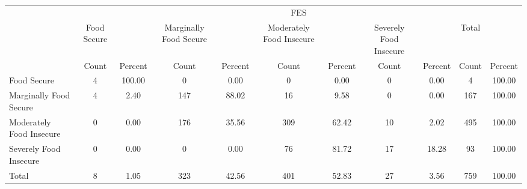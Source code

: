 {
\def\sym#1{\ifmmode^{#1}\else\(^{#1}\)\fi}
\begin{tabular}{l*{5}{cc}}
\hline\hline
            &\multicolumn{10}{c}{FES}                                                                                                         \\
            & Food Secure&            &Marginally Food Secure&            &Moderately Food Insecure&            &Severely Food Insecure&            &       Total&            \\
            &       Count&     Percent&       Count&     Percent&       Count&     Percent&       Count&     Percent&       Count&     Percent\\
\hline
Food Secure &           4&      100.00&           0&        0.00&           0&        0.00&           0&        0.00&           4&      100.00\\
Marginally Food Secure&           4&        2.40&         147&       88.02&          16&        9.58&           0&        0.00&         167&      100.00\\
Moderately Food Insecure&           0&        0.00&         176&       35.56&         309&       62.42&          10&        2.02&         495&      100.00\\
Severely Food Insecure&           0&        0.00&           0&        0.00&          76&       81.72&          17&       18.28&          93&      100.00\\
Total       &           8&        1.05&         323&       42.56&         401&       52.83&          27&        3.56&         759&      100.00\\
\hline\hline
\end{tabular}
}
